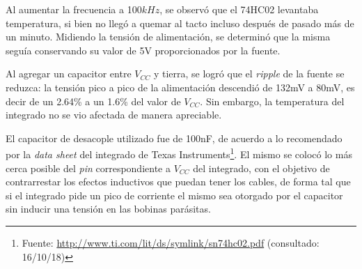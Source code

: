 \documentclass[../../e3_tp2_main.tex]{subfiles}
\begin{document}
Al aumentar la frecuencia a 100$kHz$, se observ\'o que el 74HC02 levantaba temperatura, si bien no lleg\'o a quemar al tacto incluso despu\'es de pasado m\'as de un minuto. Midiendo la tensi\'on de alimentaci\'on, se determin\'o que la misma segu\'ia conservando su valor de 5V proporcionados por la fuente.\par

Al agregar un capacitor entre $V_{CC}$ y tierra, se logr\'o que el \textit{ripple} de la fuente se reduzca: la tensi\'on pico a pico de la alimentaci\'on descendi\'o de 132mV a 80mV, es decir de un 2.64\% a un 1.6\% del valor de $V_{CC}$. Sin embargo, la temperatura del integrado no se vio afectada de manera apreciable.\par

El capacitor de desacople utilizado fue de 100nF, de acuerdo a lo recomendado por la \textit{data sheet} del integrado de Texas Instruments\footnote{Fuente: \url{http://www.ti.com/lit/ds/symlink/sn74hc02.pdf} (consultado: 16/10/18)}. El mismo se coloc\'o lo m\'as cerca posible del \textit{pin} correspondiente a $V_{CC}$ del integrado, con el objetivo de contrarrestar los efectos inductivos que puedan tener los cables, de forma tal que si el integrado pide un pico de corriente el mismo sea otorgado por el capacitor sin inducir una tensi\'on en las bobinas par\'asitas.
\end{document}

